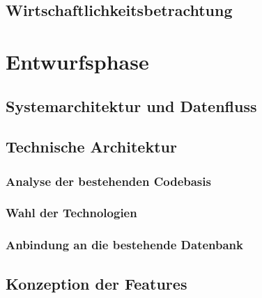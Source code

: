 \documentclass[11pt,a4paper]{article}
\begin{document}
\subsection{Wirtschaftlichkeitsbetrachtung}

\newpage
\section{Entwurfsphase}

\subsection{Systemarchitektur und Datenfluss}

\subsection{Technische Architektur}

\subsubsection{Analyse der bestehenden Codebasis}

\subsubsection{Wahl der Technologien}

\subsubsection{Anbindung an die bestehende Datenbank}

\subsection{Konzeption der Features}
\end{document}
